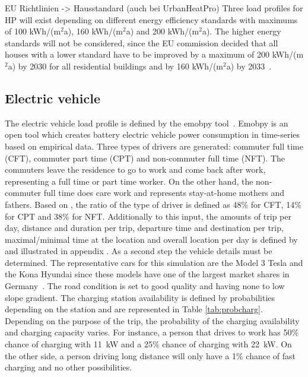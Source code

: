 EU Richtlinien -> Hausstandard (auch bei UrbanHeatPro)
Three load profiles for HP will exist depending on different energy efficiency standards with maximums of 100 kWh/(m$^2$a), 160 kWh/(m$^2$a) and 200 kWh/(m$^2$a). The higher energy standards will not be considered, since the EU commission decided that all houses with a lower standard have to be improved by a maximum of 200 kWh/(m$^2$a) by 2030 for all residential buildings and by 160 kWh/(m$^2$a) by 2033~\cite{EPBD_2021}.

\subsection{Electric vehicle}

The electric vehicle load profile is defined by the emobpy tool~\cite{emobpy}. Emobpy is an open tool which creates battery electric vehicle power consumption in time-series based on empirical data. Three types of drivers are generated: commuter full time (CFT), commuter part time (CPT) and non-commuter full time (NFT). The commuters leave the residence to go to work and come back after work, representing a full time or part time worker. On the other hand, the non-commuter full time does care work and represents stay-at-home mothers and fathers. Based on \cite{labourforce}, the ratio of the type of driver is defined as 48\% for CFT, 14\% for CPT and 38\% for NFT. Additionally to this input, the amounts of trip per day, distance and duration per trip, departure time and destination per trip, maximal/minimal time at the location and overall location per day is defined by \cite{mid} and illustrated in appendix \cite{sec:inputemobpy}. As a second step the vehicle details must be determined. The representative cars for this simulation are the Model 3 Tesla and the Kona Hyundai since these models have one of the largest market shares in Germany~\cite{kbaneuzulassung}. The road condition is set to good quality and having none to low slope gradient. The charging station availability is defined by probabilities depending on the station and are represented in Table \ref{tab:probcharg}. Depending on the purpose of the trip, the probability of the charging availability and charging capacity varies. For instance, a person that drives to work has 50\% chance of charging with 11~kW and a 25\% chance of charging with 22~kW. On the other side, a person driving long distance will only have a 1\% chance of fast charging and no other possibilities. 

